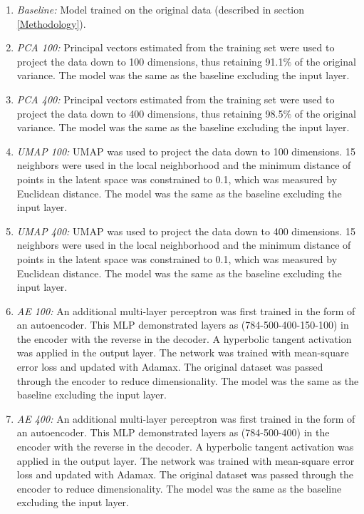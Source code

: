 \documentclass[conference]{IEEEtran}
\begin{document}
\begin{enumerate}
	\item \textit{Baseline:} Model trained on the original data (described in section \ref{Methodology}).
	\item \textit{PCA 100:} Principal vectors estimated from the training set were used to project the data down to 100 dimensions, thus retaining 91.1$\%$ of the original variance.  The model was the same as the baseline excluding the input layer.
	\item \textit{PCA 400:} Principal vectors estimated from the training set were used to project the data down to 400 dimensions, thus retaining 98.5$\%$ of the original variance.  The model was the same as the baseline excluding the input layer.
	\item \textit{UMAP 100:} UMAP was used to project the data down to 100 dimensions.  15 neighbors were used in the local neighborhood and the minimum distance of points in the latent space was constrained to 0.1, which was measured by Euclidean distance.  The model was the same as the baseline excluding the input layer.
	\item \textit{UMAP 400:} UMAP was used to project the data down to 400 dimensions.  15 neighbors were used in the local neighborhood and the minimum distance of points in the latent space was constrained to 0.1, which was measured by Euclidean distance.  The model was the same as the baseline excluding the input layer.
	\item \textit{AE 100:} An additional multi-layer perceptron was first trained in the form of an autoencoder.  This MLP demonstrated layers as (784-500-400-150-100) in the encoder with the reverse in the decoder.  A hyperbolic tangent activation was applied in the output layer.  The network was trained with mean-square error loss and updated with Adamax. The original dataset was passed through the encoder to reduce dimensionality. The model was the same as the baseline excluding the input layer.
	\item \textit{AE 400:}  An additional multi-layer perceptron was first trained in the form of an autoencoder.  This MLP demonstrated layers as (784-500-400) in the encoder with the reverse in the decoder.  A hyperbolic tangent activation was applied in the output layer.  The network was trained with mean-square error loss and updated with Adamax. The original dataset was passed through the encoder to reduce dimensionality. The model was the same as the baseline excluding the input layer.
\end{enumerate}
\end{document}
